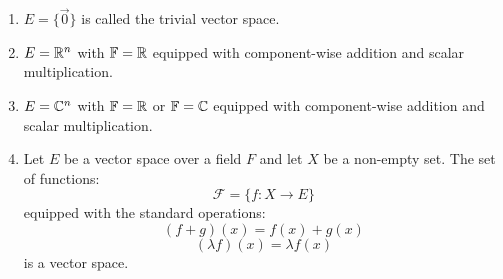 \documentclass[letterpaper,12pt,fleqn]{article}
\newcommand{\F}{\mathbb{F}}
\renewcommand{\l}{\lambda}
\newcommand{\vo}{\vec{0}}
\begin{document}
\begin{examples}
  \listbreak
  \begin{enumerate}
  \item $E=\{\vo\}$ is called the trivial vector space.

  \item $E=\mathbb{R}^n$ with $\F=\R$ equipped with component-wise addition and scalar
    multiplication.
  
  \item $E=\mathbb{C}^n$ with $\F=\R$ or $\F=\C$ equipped with component-wise addition
    and scalar multiplication.

  \item Let $E$ be a vector space over a field $F$ and let $X$ be a non-empty
    set. The set of functions:
    \[\mathcal{F}=\{f:X\to E\}\]
    equipped with the standard operations:
    \[(f+g)(x)=f(x)+g(x)\]
    \[(\l f)(x)=\l f(x)\]
    is a vector space.
  \end{enumerate}
\end{examples}
\end{document}
